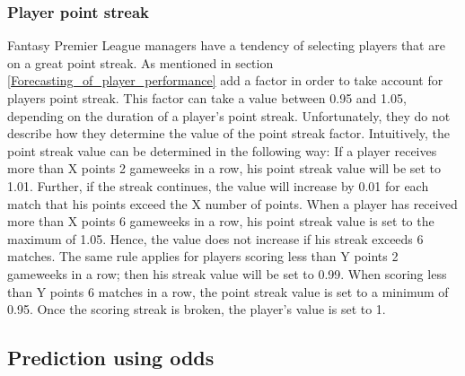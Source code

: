 \subsubsection{Player point streak}
Fantasy Premier League managers have a tendency of selecting players that are on a great point streak. As mentioned in section \ref{Forecasting_of_player_performance} \cite{Bonomo} add a factor in order to take account for players point streak. This factor can take a value between 0.95 and 1.05, depending on the duration of a player's point streak. Unfortunately, they do not describe how they determine the value of the point streak factor. Intuitively, the point streak value can be determined in the following way: 
\newpar
If a player receives more than X points 2 gameweeks in a row, his point streak value will be set to 1.01. Further, if the streak continues, the value will increase by 0.01 for each match that his points exceed the X number of points. When a player has received more than X points 6 gameweeks in a row, his point streak value is set to the maximum of 1.05. Hence, the value does not increase if his streak exceeds 6 matches. The same rule applies for players scoring less than Y points 2 gameweeks in a row; then his streak value will be set to 0.99. When scoring less than Y points 6 matches in a row, the point streak value is set to a minimum of 0.95. Once the scoring streak is broken, the player's value is set to 1. 




\subsection{Prediction using odds}
